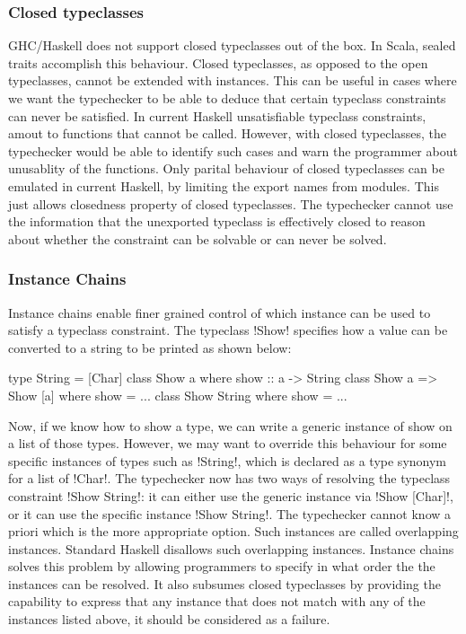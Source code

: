 \documentclass[screen,nonacm]{acmart}
\begin{document}
\subsubsection{Closed typeclasses}
GHC/Haskell does not support closed typeclasses out of the box. In Scala, sealed traits accomplish this behaviour. Closed typeclasses, as opposed to the open typeclasses, cannot be extended with instances. This can be useful in cases where we want the typechecker to be able to deduce that certain typeclass constraints can never be satisfied. In current Haskell unsatisfiable typeclass constraints, amout to functions that cannot be called. However, with closed typeclasses, the typechecker would be able to identify such cases and warn the programmer about unusablity of the functions. Only parital behaviour of closed typeclasses can be emulated in current Haskell, by limiting the export names from modules. This just allows closedness property of closed typeclasses. The typechecker cannot use the information that the unexported typeclass is effectively closed to reason about whether the constraint can be solvable or can never be solved.

\subsubsection{Instance Chains}
Instance chains\cite{morris_instance_2010} enable finer grained control of which instance can be used to satisfy a typeclass constraint. The typeclass !Show! specifies how a value can be converted to a string to be printed as shown below:

\begin{CenteredBox}
\begin{code}
type String = [Char]
class Show a where show :: a -> String
class Show a => Show [a] where show = ...
class Show String where show = ...
\end{code}
\end{CenteredBox}
Now, if we know how to show a type, we can write a generic instance of
show on a list of those types. However, we may want to override this
behaviour for some specific instances of types such as !String!, which
is declared as a type synonym for a list of !Char!. The typechecker
now has two ways of resolving the typeclass constraint !Show String!:
it can either use the generic instance via !Show [Char]!, or it can
use the specific instance !Show String!. The typechecker cannot know a
priori which is the more appropriate option. Such instances are called
overlapping instances. Standard Haskell disallows such overlapping
instances. Instance chains solves this problem by allowing programmers
to specify in what order the the instances can be resolved. It also
subsumes closed typeclasses by providing the capability to express
that any instance that does not match with any of the instances listed
above, it should be considered as a failure.
\end{document}
